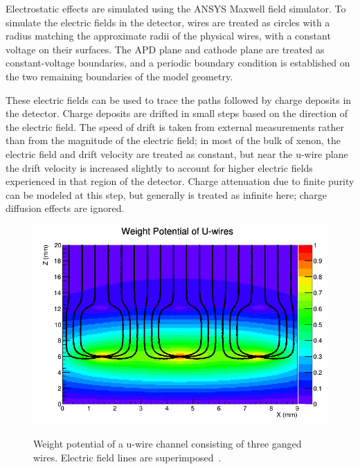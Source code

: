 Electrostatic effects are simulated using the ANSYS Maxwell field simulator.  To simulate the electric fields in the detector, wires are treated as circles with a radius matching the approximate radii of the physical wires, with a constant voltage on their surfaces.  The APD plane and cathode plane are treated as constant-voltage boundaries, and a periodic boundary condition is established on the two remaining boundaries of the model geometry.

These electric fields can be used to trace the paths followed by charge deposits in the detector.  Charge deposits are drifted in small steps based on the direction of the electric field.  The speed of drift is taken from external measurements rather than from the magnitude of the electric field; in most of the bulk of xenon, the electric field and drift velocity are treated as constant, but near the u-wire plane the drift velocity is increased slightly to account for higher electric fields experienced in that region of the detector.  Charge attenuation due to finite purity can be modeled at this step, but generally is treated as infinite here; charge diffusion effects are ignored.

\begin{figure}
\begin{center}
\includegraphics[keepaspectratio=true,width=\textwidth]{WeightPotContoursU_WithE.png}
\end{center}
\renewcommand{\baselinestretch}{1}
\small\normalsize
\begin{quote}
\caption{Weight potential of a u-wire channel consisting of three ganged wires.  Electric field lines are superimposed~\cite{MCDocumentRun2a}.}
\label{fig:UWireWeightPotential}
\end{quote}
\end{figure}
\renewcommand{\baselinestretch}{2}
\small\normalsize

